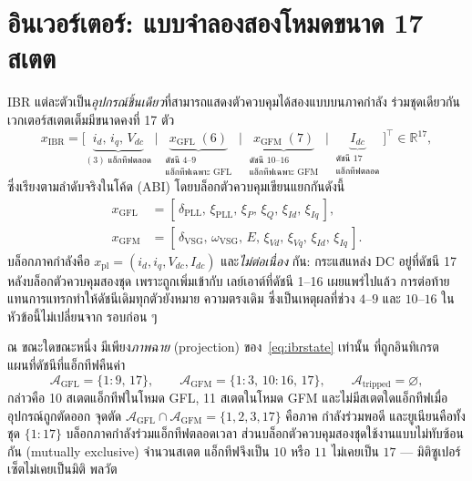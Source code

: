 \documentclass[12pt,a4paper]{article}
\begin{document}
\section{อินเวอร์เตอร์: แบบจำลองสองโหมดขนาด 17 สเตต}\label{sec:ibr}
IBR แต่ละตัวเป็น\emph{อุปกรณ์ชิ้นเดียว}ที่สามารถแสดงตัวควบคุมได้สองแบบบนภาคกำลัง
ร่วมชุดเดียวกัน เวกเตอร์สเตตเต็มมีขนาดคงที่ 17 ตัว
\begin{equation}
  x_{\mathrm{IBR}}
   =\bigl[\underbrace{i_d,\,i_q,\,V_{dc}}_{(3)\;\text{แอ็กทีฟตลอด}}\;\big|\;
          \underbrace{x_{\mathrm{GFL}}\;(6)}_{\substack{\text{ดัชนี }4\text{--}9\\
            \text{แอ็กทีฟเฉพาะ GFL}}}\;\big|\;
          \underbrace{x_{\mathrm{GFM}}\;(7)}_{\substack{\text{ดัชนี }10\text{--}16\\
            \text{แอ็กทีฟเฉพาะ GFM}}}\;\big|\;
          \underbrace{I_{dc}}_{\substack{\text{ดัชนี }17\\
            \text{แอ็กทีฟตลอด}}}\bigr]^{\top}
   \in\mathbb{R}^{17},
   \label{eq:ibrstate}
\end{equation}
ซึ่งเรียงตามลำดับจริงในโค้ด (ABI) โดยบล็อกตัวควบคุมเขียนแยกกันดังนี้
\begin{align}
  x_{\mathrm{GFL}}&=[\,\delta_{\mathrm{PLL}},\,\xi_{\mathrm{PLL}},\,\xi_P,\,\xi_Q,
      \,\xi_{Id},\,\xi_{Iq}\,],\\
  x_{\mathrm{GFM}}&=[\,\delta_{\mathrm{VSG}},\,\omega_{\mathrm{VSG}},\,E,
      \,\xi_{Vd},\,\xi_{Vq},\,\xi_{Id},\,\xi_{Iq}\,].
\end{align}
บล็อกภาคกำลังคือ $x_{\mathrm{pl}}=(i_d,i_q,V_{dc},I_{dc})$ และ\emph{ไม่ต่อเนื่อง}
กัน: กระแสแหล่ง DC อยู่ที่ดัชนี 17 หลังบล็อกตัวควบคุมสองชุด เพราะถูกเพิ่มเข้ากับ
เลย์เอาต์ที่ดัชนี 1--16 เผยแพร่ไปแล้ว การต่อท้ายแทนการแทรกทำให้ดัชนีเดิมทุกตัวยังหมาย
ความตรงเดิม ซึ่งเป็นเหตุผลที่ช่วง $4$--$9$ และ $10$--$16$ ในหัวข้อนี้ไม่เปลี่ยนจาก
รอบก่อน ๆ

ณ ขณะใดขณะหนึ่ง มีเพียง\emph{ภาพฉาย} (projection) ของ~\eqref{eq:ibrstate} เท่านั้น
ที่ถูกอินทิเกรต แผนที่ดัชนีที่แอ็กทีฟคืนค่า
\begin{equation}
  \mathcal{A}_{\mathrm{GFL}}=\{1{:}9,\,17\},\qquad
  \mathcal{A}_{\mathrm{GFM}}=\{1{:}3,\,10{:}16,\,17\},\qquad
  \mathcal{A}_{\mathrm{tripped}}=\varnothing,
  \label{eq:ibractive}
\end{equation}
กล่าวคือ 10 สเตตแอ็กทีฟในโหมด GFL, 11 สเตตในโหมด GFM และไม่มีสเตตใดแอ็กทีฟเมื่อ
อุปกรณ์ถูกตัดออก จุดตัด
$\mathcal{A}_{\mathrm{GFL}}\cap\mathcal{A}_{\mathrm{GFM}}=\{1,2,3,17\}$ คือภาค
กำลังร่วมพอดี และยูเนียนคือทั้งชุด $\{1{:}17\}$ บล็อกภาคกำลังร่วมแอ็กทีฟตลอดเวลา
ส่วนบล็อกตัวควบคุมสองชุดใช้งานแบบไม่ทับซ้อนกัน (mutually exclusive) จำนวนสเตต
แอ็กทีฟจึงเป็น $10$ หรือ $11$ ไม่เคยเป็น $17$ --- มิติซูเปอร์เซ็ตไม่เคยเป็นมิติ
พลวัต
\end{document}
